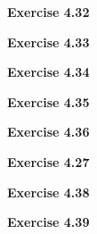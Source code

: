 \documentclass{article}
\begin{document}
\bigskip

\begin{framed}
    \noindent \textbf{Exercise 4.32}
    
    \medskip
    
    
\end{framed}


\bigskip

\begin{framed}
    \noindent \textbf{Exercise 4.33}
    
    \medskip
    
    
\end{framed}


\bigskip

\begin{framed}
    \noindent \textbf{Exercise 4.34}
    
    \medskip
    
    
\end{framed}


\bigskip

\begin{framed}
    \noindent \textbf{Exercise 4.35}
    
    \medskip
    
    
\end{framed}


\bigskip

\begin{framed}
    \noindent \textbf{Exercise 4.36}
    
    \medskip
    
    
\end{framed}


\bigskip

\begin{framed}
    \noindent \textbf{Exercise 4.27}
    
    \medskip
    
    
\end{framed}


\bigskip

\begin{framed}
    \noindent \textbf{Exercise 4.38}
    
    \medskip
    
    
\end{framed}


\bigskip

\begin{framed}
    \noindent \textbf{Exercise 4.39}
    
    \medskip
    
    
\end{framed}
\end{document}
